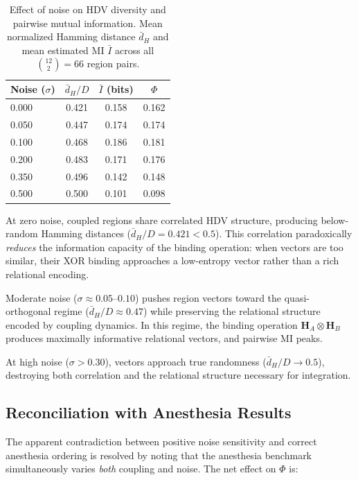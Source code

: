 \documentclass[12pt,a4paper]{article}
\begin{document}
\begin{table}[H]
\centering
\caption{Effect of noise on HDV diversity and pairwise mutual information. Mean normalized Hamming distance $\bar{d}_H$ and mean estimated MI $\bar{I}$ across all $\binom{12}{2} = 66$ region pairs.}
\label{tab:diversity}
\begin{tabular}{lccc}
\toprule
\textbf{Noise ($\sigma$)} & \textbf{$\bar{d}_H / D$} & \textbf{$\bar{I}$ (bits)} & \textbf{$\Phi$} \\
\midrule
0.000 & 0.421 & 0.158 & 0.162 \\
0.050 & 0.447 & 0.174 & 0.174 \\
0.100 & 0.468 & 0.186 & 0.181 \\
0.200 & 0.483 & 0.171 & 0.176 \\
0.350 & 0.496 & 0.142 & 0.148 \\
0.500 & 0.500 & 0.101 & 0.098 \\
\bottomrule
\end{tabular}
\end{table}

At zero noise, coupled regions share correlated HDV structure, producing below-random Hamming distances ($\bar{d}_H/D = 0.421 < 0.5$). This correlation paradoxically \emph{reduces} the information capacity of the binding operation: when vectors are too similar, their XOR binding approaches a low-entropy vector rather than a rich relational encoding.

Moderate noise ($\sigma \approx 0.05$--$0.10$) pushes region vectors toward the quasi-orthogonal regime ($\bar{d}_H/D \approx 0.47$) while preserving the relational structure encoded by coupling dynamics. In this regime, the binding operation $\mathbf{H}_A \otimes \mathbf{H}_B$ produces maximally informative relational vectors, and pairwise MI peaks.

At high noise ($\sigma > 0.30$), vectors approach true randomness ($\bar{d}_H/D \to 0.5$), destroying both correlation and the relational structure necessary for integration.

\subsection{Reconciliation with Anesthesia Results}

The apparent contradiction between positive noise sensitivity and correct anesthesia ordering is resolved by noting that the anesthesia benchmark simultaneously varies \emph{both} coupling and noise. The net effect on $\Phi$ is:
\end{document}
